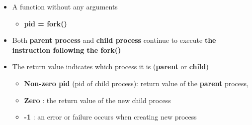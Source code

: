 \documentclass[a4paper,11pt,english]{article}
\begin{document}
\begin{itemize}
\begin{itemize}
            \item A function without any arguments
                \begin{itemize}
                    \item \textbf{\color{blue}pid = fork()} 
                \end{itemize}
            \item Both \textbf{\color{blue}parent process} and \textbf{\color{blue}child process} continue to execute \textbf{\color{red}the instruction following the fork()}
            \item The return value indicates which process it is (\textbf{\color{blue}parent} or \textbf{\color{red}child})
                \begin{itemize}
                    \item \textbf{\color{blue}Non-zero pid} (pid of child process): return value of the \textbf{\color{blue}parent} process,
                    \item \textbf{\color{red}Zero} : the return value of the new child process
                    \item \textbf{-1} : an error or failure occurs when creating new process
                \end{itemize}


\end{itemize}
\end{itemize}
\end{document}
